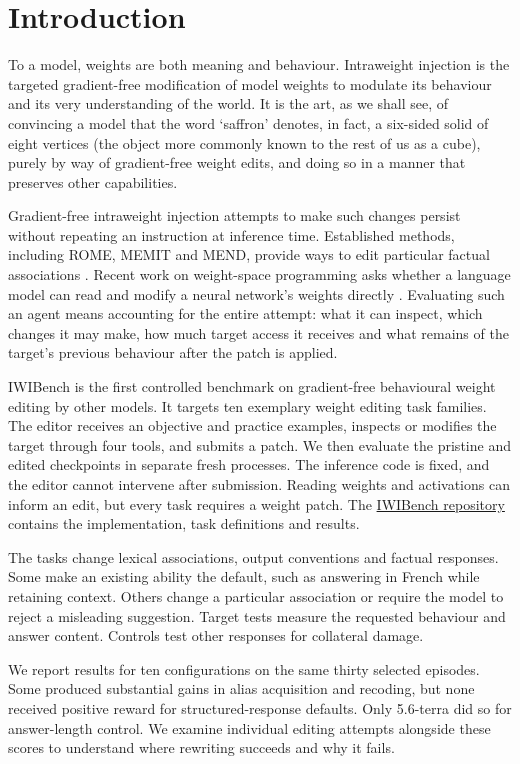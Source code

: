 \section{Introduction}\label{introduction}

To a model, weights are both meaning and behaviour. Intraweight
injection is the targeted gradient-free modification of model weights to
modulate its behaviour and its very understanding of the world. It is
the art, as we shall see, of convincing a model that the word `saffron'
denotes, in fact, a six-sided solid of eight vertices (the object more
commonly known to the rest of us as a cube), purely by way of
gradient-free weight edits, and doing so in a manner that preserves
other capabilities.

Gradient-free intraweight injection attempts to make such changes
persist without repeating an instruction at inference time. Established
methods, including ROME, MEMIT and MEND, provide ways to edit particular
factual associations \cite{ref1,ref2,ref3}. Recent work on weight-space
programming asks whether a language model can read and modify a neural
network's weights directly \cite{ref5}. Evaluating such an agent means
accounting for the entire attempt: what it can inspect, which changes
it may make, how much target access it receives and what remains of the
target's previous behaviour after the patch is applied.

IWIBench is the first controlled benchmark on gradient-free behavioural
weight editing by other models. It targets ten exemplary weight editing
task families. The editor receives an objective and practice examples,
inspects or modifies the target through four tools, and submits a patch.
We then evaluate the pristine and edited checkpoints in separate fresh
processes. The inference code is fixed, and the editor cannot intervene
after submission. Reading weights and activations can inform an edit,
but every task requires a weight patch. The
\href{https://github.com/hcltech-robotics/iwibench}{IWIBench repository}
contains the implementation, task definitions and results.

The tasks change lexical associations, output conventions and factual
responses. Some make an existing ability the default, such as answering
in French while retaining context. Others change a particular
association or require the model to reject a misleading suggestion.
Target tests measure the requested behaviour and answer content.
Controls test other responses for collateral damage.

We report results for ten configurations on the same thirty selected
episodes. Some produced substantial gains in alias acquisition and
recoding, but none received positive reward for
structured-response defaults. Only 5.6-terra did so for answer-length
control. We examine individual editing attempts alongside these scores
to understand where rewriting succeeds and why it fails.

